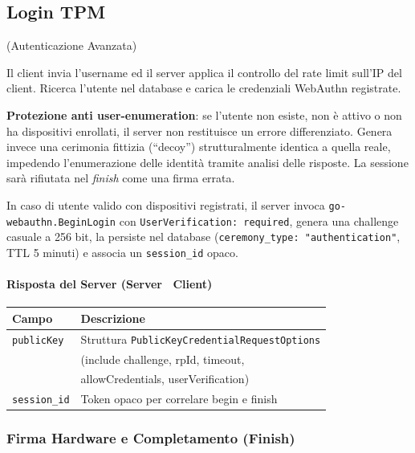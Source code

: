   

\subsection{Login TPM}(Autenticazione Avanzata)



Il client invia l'username ed il server applica il controllo del rate limit sull'IP del client. Ricerca
l'utente nel database e carica le credenziali WebAuthn registrate.

\medskip
\noindent\textbf{Protezione anti user-enumeration}: se l'utente non esiste,
non è attivo o non ha dispositivi enrollati, il server non restituisce un
errore differenziato. Genera invece una cerimonia fittizia (``decoy'')
strutturalmente identica a quella reale, impedendo l'enumerazione delle
identità tramite analisi delle risposte. La sessione sarà rifiutata nel
\emph{finish} come una firma errata.
\medskip

In caso di utente valido con dispositivi registrati, il server invoca
\texttt{go-webauthn.BeginLogin} con \texttt{UserVerification: required},
genera una challenge casuale a 256 bit, la persiste nel database
(\texttt{ceremony\_type: "authentication"}, TTL 5 minuti) e associa
un \texttt{session\_id} opaco.

\paragraph{Risposta del Server (Server \textrightarrow\ Client)}

\begin{center}
\begin{tabular}{@{}lp{8.5cm}@{}}
\toprule
\textbf{Campo} & \textbf{Descrizione} \\
\midrule
\texttt{publicKey}   & Struttura \texttt{PublicKeyCredentialRequestOptions} \\
                     & (include challenge, rpId, timeout, \\
                     & allowCredentials, userVerification) \\
\texttt{session\_id} & Token opaco per correlare begin e finish \\
\bottomrule
\end{tabular}
\end{center}

\subsubsection{ Firma Hardware e Completamento (Finish)}

